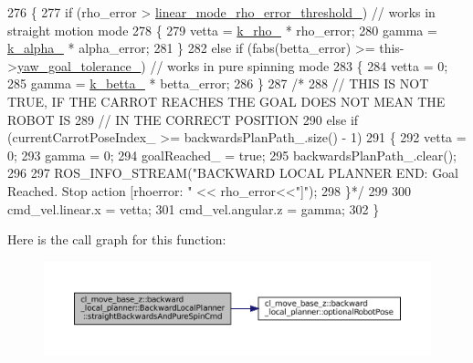 \begin{DoxyCode}
276         \{
277             \textcolor{keywordflow}{if} (rho\_error > \hyperlink{classcl__move__base__z_1_1backward__local__planner_1_1BackwardLocalPlanner_a858efacf597a3a35c97aec9ca53e5900}{linear\_mode\_rho\_error\_threshold\_}) \textcolor{comment}{// works in
       straight motion mode}
278             \{
279                 vetta = \hyperlink{classcl__move__base__z_1_1backward__local__planner_1_1BackwardLocalPlanner_ad8a36184bfb011545c751109e23d3b98}{k\_rho\_} * rho\_error;
280                 gamma = \hyperlink{classcl__move__base__z_1_1backward__local__planner_1_1BackwardLocalPlanner_abf7a5a56de2ee41afba7e63c0628ec35}{k\_alpha\_} * alpha\_error;
281             \}
282             \textcolor{keywordflow}{else} \textcolor{keywordflow}{if} (fabs(betta\_error) >= this->\hyperlink{classcl__move__base__z_1_1backward__local__planner_1_1BackwardLocalPlanner_a9c5104d328041fcde5a3c02664abad48}{yaw\_goal\_tolerance\_}) \textcolor{comment}{// works in pure
       spinning mode}
283             \{
284                 vetta = 0;
285                 gamma = \hyperlink{classcl__move__base__z_1_1backward__local__planner_1_1BackwardLocalPlanner_a9f257183d87f1d732cb7e404f09905ad}{k\_betta\_} * betta\_error;
286             \}
287             \textcolor{comment}{/*}
288 \textcolor{comment}{            // THIS IS NOT TRUE, IF THE CARROT REACHES THE GOAL DOES NOT MEAN THE ROBOT IS}
289 \textcolor{comment}{            // IN THE CORRECT POSITION}
290 \textcolor{comment}{            else if (currentCarrotPoseIndex\_ >= backwardsPlanPath\_.size() - 1)}
291 \textcolor{comment}{            \{}
292 \textcolor{comment}{                vetta = 0;}
293 \textcolor{comment}{                gamma = 0;}
294 \textcolor{comment}{                goalReached\_ = true;}
295 \textcolor{comment}{                backwardsPlanPath\_.clear();}
296 \textcolor{comment}{}
297 \textcolor{comment}{                ROS\_INFO\_STREAM("BACKWARD LOCAL PLANNER END: Goal Reached. Stop action [rhoerror: " <<
       rho\_error<<"]");}
298 \textcolor{comment}{            \}*/}
299 
300             cmd\_vel.linear.x = vetta;
301             cmd\_vel.angular.z = gamma;
302         \}
\end{DoxyCode}
Here is the call graph for this function\+:
\nopagebreak
\begin{figure}[H]
\begin{center}
\leavevmode
\includegraphics[width=350pt]{classcl__move__base__z_1_1backward__local__planner_1_1BackwardLocalPlanner_a6069866b4a3150883de3212d8e43e8f8_cgraph}
\end{center}
\end{figure}
